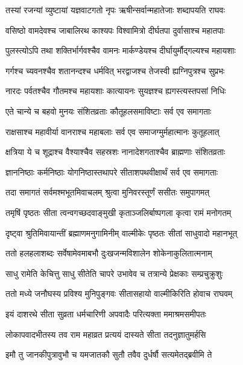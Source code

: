 
\twolineshloka
{तस्यां रजन्यां व्युष्टायां यज्ञवाटगतो नृपः}
{ऋषीन्सर्वान्महातेजाः शब्दापयति राघवः} %

\twolineshloka
{वसिष्ठो वामदेवश्च जाबालिरथ काश्यपः}
{विश्वामित्रो दीर्घतपा दुर्वासाश्च महातपाः} %

\twolineshloka
{पुलस्त्योऽपि तथा शक्तिर्भार्गवश्चैव वामनः}
{मार्कण्डेयश्च दीर्घायुर्मौद्गल्यश्च महायशाः} %

\twolineshloka
{गर्गश्च च्यवनश्चैव शतानन्दश्च धर्मवित्}
{भरद्वाजश्च तेजस्वी ह्यग्निपुत्रश्च सुप्रभः} %

\twolineshloka
{नारदः पर्वतश्चैव गौतमश्च महायशाः}
{कात्यायनः सुयज्ञश्च ह्यगस्त्यस्तपसां निधिः} %

\twolineshloka
{एते चान्ये च बहवो मुनयः संशितव्रताः}
{कौतूहलसमाविष्टाः सर्व एव समागताः} %

\twolineshloka
{राक्षसाश्च महावीर्या वानराश्च महाबलाः}
{सर्व एव समाजग्मुर्महात्मानः कुतूहलात्} %

\twolineshloka
{क्षत्रिया ये च शूद्राश्च वैश्याश्चैव सहस्रशः}
{नानादेशगताश्चैव ब्राह्मणाः संशितव्रताः} %

\twolineshloka
{ज्ञाननिष्ठाः कर्मनिष्ठाः योगनिष्ठास्तथापरे}
{सीताशपथवीक्षार्थं सर्व एव समागताः} %

\twolineshloka
{तदा समागतं सर्वमश्मभूतमिवाचलम्}
{श्रुत्वा मुनिवरस्तूर्णं ससीतः समुपागमत्} %

\twolineshloka
{तमृषिं पृष्ठतः सीता त्वन्वगच्छदवाङ्मुखी}
{कृताञ्जलिर्बाष्पगला कृत्वा रामं मनोगतम्} %

\twolineshloka
{दृष्ट्वा श्रुतिमिवायान्तीं ब्रह्माणमनुगामिनीम्}
{वाल्मीकेः पृष्ठतः सीतां साधुवादो महानभूत्} %

\twolineshloka
{ततो हलहलाशब्दः सर्वेषामेवमाबभौ}
{दुःखजन्मविशालेन शोकेनाकुलितात्मनाम्} %

\twolineshloka
{साधु रामेति केचित्तु साधु सीतेति चापरे}
{उभावेव च तत्रान्ये प्रेक्षकाः सम्प्रचुक्रुशुः} %

\twolineshloka
{ततो मध्ये जनौघस्य प्रविश्य मुनिपुङ्गवः}
{सीतासहायो वाल्मीकिरिति होवाच राघवम्} %

\twolineshloka
{इयं दाशरथे सीता सुव्रता धर्मचारिणी}
{अपवादैः परित्यक्ता ममाश्रमसमीपतः} %

\twolineshloka
{लोकापवादभीतस्य तव राम महाव्रत}
{प्रत्ययं दास्यते सीता तदनुज्ञातुमर्हसि} %

\twolineshloka
{इमौ तु जानकीपुत्रावुभौ च यमजातकौ}
{सुतौ तवैव दुर्धर्षौ सत्यमेतद्ब्रवीमि ते} %

